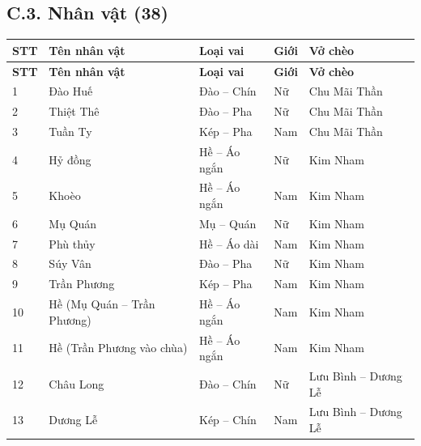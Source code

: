 \subsection*{C.3. Nhân vật (38)}

\begin{longtable}{|p{0.6cm}|p{4.5cm}|p{3.0cm}|p{1.0cm}|p{4.4cm}|}
  \hline
  \textbf{STT} & \textbf{Tên nhân vật} & \textbf{Loại vai} & \textbf{Giới} & \textbf{Vở chèo} \\
  \hline
  \endfirsthead
  \hline
  \textbf{STT} & \textbf{Tên nhân vật} & \textbf{Loại vai} & \textbf{Giới} & \textbf{Vở chèo} \\
  \hline
  \endhead
  \hline
  \endfoot

  1  & Đào Huế                                  & Đào -- Chín    & Nữ  & Chu Mãi Thần          \\ \hline
  2  & Thiệt Thê                                & Đào -- Pha     & Nữ  & Chu Mãi Thần          \\ \hline
  3  & Tuần Ty                                  & Kép -- Pha     & Nam & Chu Mãi Thần          \\ \hline
  4  & Hỷ đồng                                  & Hề -- Áo ngắn  & Nữ  & Kim Nham              \\ \hline
  5  & Khoèo                                    & Hề -- Áo ngắn  & Nam & Kim Nham              \\ \hline
  6  & Mụ Quán                                  & Mụ -- Quán     & Nữ  & Kim Nham              \\ \hline
  7  & Phù thủy                                 & Hề -- Áo dài   & Nam & Kim Nham              \\ \hline
  8  & Súy Vân                                  & Đào -- Pha     & Nữ  & Kim Nham              \\ \hline
  9  & Trần Phương                              & Kép -- Pha     & Nam & Kim Nham              \\ \hline
  10 & Hề (Mụ Quán -- Trần Phương)              & Hề -- Áo ngắn  & Nam & Kim Nham              \\ \hline
  11 & Hề (Trần Phương vào chùa)                & Hề -- Áo ngắn  & Nam & Kim Nham              \\ \hline
  12 & Châu Long                                & Đào -- Chín    & Nữ  & Lưu Bình -- Dương Lễ  \\ \hline
  13 & Dương Lễ                                 & Kép -- Chín    & Nam & Lưu Bình -- Dương Lễ  \\ \hline

\end{longtable}
